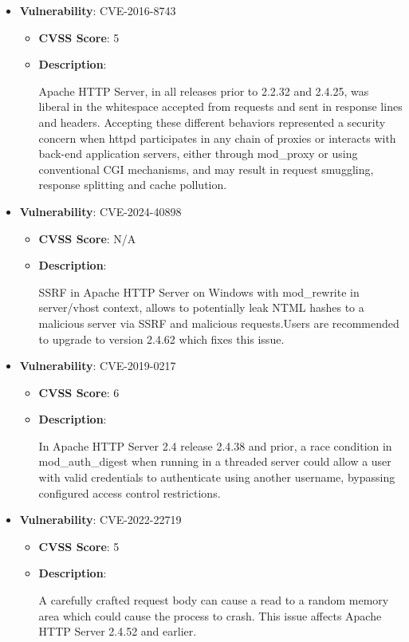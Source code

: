 \documentclass{article}
\begin{document}
\begin{itemize}
        \item \textbf{Vulnerability}: CVE-2016-8743
        \begin{itemize}
            \item \textbf{CVSS Score}:  5 
            \item \textbf{Description}:
            \parbox[t]{0.9\linewidth}{
                \ttfamily Apache HTTP Server, in all releases prior to 2.2.32 and 2.4.25, was liberal in the whitespace accepted from requests and sent in response lines and headers. Accepting these different behaviors represented a security concern when httpd participates in any chain of proxies or interacts with back-end application servers, either through mod\_proxy or using conventional CGI mechanisms, and may result in request smuggling, response splitting and cache pollution.
            }
        \end{itemize}
    
        \item \textbf{Vulnerability}: CVE-2024-40898
        \begin{itemize}
            \item \textbf{CVSS Score}:  N/A 
            \item \textbf{Description}:
            \parbox[t]{0.9\linewidth}{
                \ttfamily SSRF in Apache HTTP Server on Windows with mod\_rewrite in server/vhost context, allows to potentially leak NTML hashes to a malicious server via SSRF and malicious requests.Users are recommended to upgrade to version 2.4.62 which fixes this issue.
            }
        \end{itemize}
    
        \item \textbf{Vulnerability}: CVE-2019-0217
        \begin{itemize}
            \item \textbf{CVSS Score}:  6 
            \item \textbf{Description}:
            \parbox[t]{0.9\linewidth}{
                \ttfamily In Apache HTTP Server 2.4 release 2.4.38 and prior, a race condition in mod\_auth\_digest when running in a threaded server could allow a user with valid credentials to authenticate using another username, bypassing configured access control restrictions.
            }
        \end{itemize}
    
        \item \textbf{Vulnerability}: CVE-2022-22719
        \begin{itemize}
            \item \textbf{CVSS Score}:  5 
            \item \textbf{Description}:
            \parbox[t]{0.9\linewidth}{
                \ttfamily A carefully crafted request body can cause a read to a random memory area which could cause the process to crash. This issue affects Apache HTTP Server 2.4.52 and earlier.
            }
        \end{itemize}
    

\end{itemize}
\end{document}
